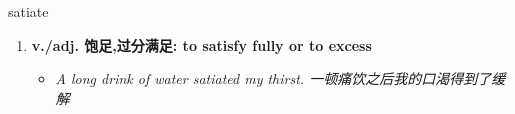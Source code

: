 
\begin{frame}
{\huge satiate}
\begin{center}
\begin{enumerate}\Large
  \item \textbf{v./adj. 饱足,过分满足: to satisfy fully or to excess}
  \begin{itemize}
    \item \em{\Large{A long drink of water satiated my thirst. 一顿痛饮之后我的口渴得到了缓解}}
  \end{itemize}
\end{enumerate}
\end{center}
\end{frame}
